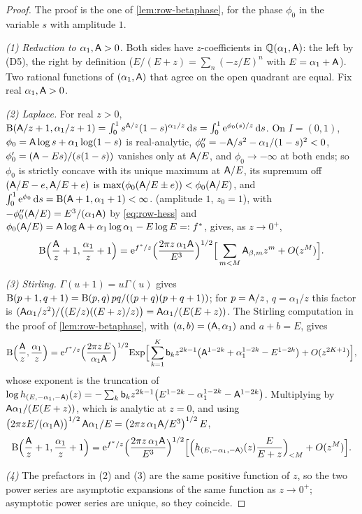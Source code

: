 \begin{proof}
The proof is the one of \cref{lem:row-betaphase}, for the phase $\phi_0$ in the variable $s$ with amplitude $1$.

\emph{(1) Reduction to $\alpha_1,\mathsf{A}>0$.} Both sides have $z$-coefficients in $\mathbb{Q}(\alpha_1,\mathsf{A})$: the left by (D5), the right by definition ($E/(E+z)=\sum_n(-z/E)^n$ with $E=\alpha_1+\mathsf{A}$). Two rational functions of $(\alpha_1,\mathsf{A})$ that agree on the open quadrant are equal. Fix real $\alpha_1,\mathsf{A}>0$.

\emph{(2) Laplace.} For real $z>0$, $\mathrm{B}(\mathsf{A}/z+1,\alpha_1/z+1)=\int_0^1s^{\mathsf{A}/z}(1-s)^{\alpha_1/z}\,\mathrm{d} s=\int_0^1\mathrm{e}^{\phi_0(s)/z}\,\mathrm{d} s$. On $I=(0,1)$, $\phi_0=\mathsf{A}\log s+\alpha_1\log(1-s)$ is real-analytic, $\phi_0''=-\mathsf{A}/s^2-\alpha_1/(1-s)^2<0$, $\phi_0'=(\mathsf{A}-Es)/(s(1-s))$ vanishes only at $\mathsf{A}/E$, and $\phi_0\to-\infty$ at both ends; so $\phi_0$ is strictly concave with its unique maximum at $\mathsf{A}/E$, its supremum off $(\mathsf{A}/E-e,\mathsf{A}/E+e)$ is $\max(\phi_0(\mathsf{A}/E\pm e))<\phi_0(\mathsf{A}/E)$, and $\int_0^1\mathrm{e}^{\phi_0}\,\mathrm{d} s=\mathrm{B}(\mathsf{A}+1,\alpha_1+1)<\infty$.  (amplitude $1$, $z_0=1$), with $-\phi_0''(\mathsf{A}/E)=E^3/(\alpha_1\mathsf{A})$ by \eqref{eq:row-hess} and $\phi_0(\mathsf{A}/E)=\mathsf{A}\log\mathsf{A}+\alpha_1\log\alpha_1-E\log E=:f^\ast$, gives, as $z\to0^+$,
\[
\mathrm{B}\Big(\frac{\mathsf{A}}z+1,\frac{\alpha_1}z+1\Big)=\mathrm{e}^{f^\ast/z}\Big(\frac{2\pi z\,\alpha_1\mathsf{A}}{E^3}\Big)^{1/2}\Big[\sum_{m<M}\mathsf{A}_{\beta,m}z^m+O(z^M)\Big].
\]

\emph{(3) Stirling.} $\Gamma(u+1)=u\Gamma(u)$ gives $\mathrm{B}(p+1,q+1)=\mathrm{B}(p,q)\,pq/((p+q)(p+q+1))$; for $p=\mathsf{A}/z$, $q=\alpha_1/z$ this factor is $(\mathsf{A}\alpha_1/z^2)/\big((E/z)((E+z)/z)\big)=\mathsf{A}\alpha_1/(E(E+z))$. The Stirling computation in the proof of \cref{lem:row-betaphase}, with $(a,b)=(\mathsf{A},\alpha_1)$ and $a+b=E$, gives
\[
\mathrm{B}\Big(\frac{\mathsf{A}}z,\frac{\alpha_1}z\Big)=\mathrm{e}^{f^\ast/z}\Big(\frac{2\pi z\,E}{\alpha_1\mathsf{A}}\Big)^{1/2}\mathrm{Exp}\Big[\sum_{k=1}^{K}\mathsf{b}_kz^{2k-1}\big(\mathsf{A}^{1-2k}+\alpha_1^{1-2k}-E^{1-2k}\big)+O(z^{2K+1})\Big],
\]
whose exponent is the truncation of $\log h_{(E,-\alpha_1,-\mathsf{A})}(z)=-\sum_k\mathsf{b}_kz^{2k-1}\big(E^{1-2k}-\alpha_1^{1-2k}-\mathsf{A}^{1-2k}\big)$. Multiplying by $\mathsf{A}\alpha_1/(E(E+z))$, which is analytic at $z=0$, and using $\big(2\pi zE/(\alpha_1\mathsf{A})\big)^{1/2}\,\mathsf{A}\alpha_1/E=\big(2\pi z\,\alpha_1\mathsf{A}/E^3\big)^{1/2}\,E$,
\[
\mathrm{B}\Big(\frac{\mathsf{A}}z+1,\frac{\alpha_1}z+1\Big)=\mathrm{e}^{f^\ast/z}\Big(\frac{2\pi z\,\alpha_1\mathsf{A}}{E^3}\Big)^{1/2}\Big[\Big(h_{(E,-\alpha_1,-\mathsf{A})}(z)\frac{E}{E+z}\Big)_{<M}+O(z^M)\Big].
\]

\emph{(4)} The prefactors in (2) and (3) are the same positive function of $z$, so the two power series are asymptotic expansions of the same function as $z\to0^+$; asymptotic power series are unique, so they coincide.
\end{proof}

